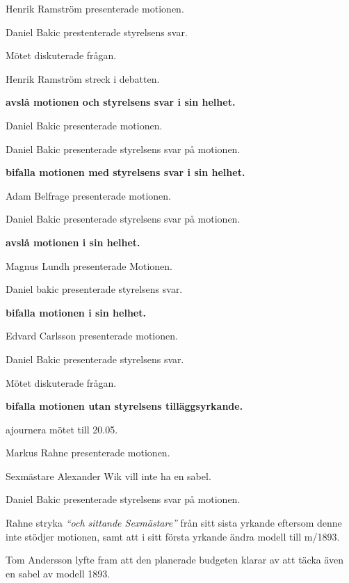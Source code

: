 \documentclass[10pt]{article}
\begin{document}
\begin{paragrafer}
\begin{paragrafer}
		Henrik Ramström presenterade motionen.

		Daniel Bakic prestenterade styrelsens svar.

		Mötet diskuterade frågan.

		Henrik Ramström \ypa streck i debatten.

		\Mbaby

		\textbf{\Mba avslå motionen och styrelsens svar i sin helhet.}

		Daniel Bakic presenterade motionen.

		Daniel Bakic presenterade styrelsens svar på motionen.

		\textbf{\Mba bifalla motionen med styrelsens svar i sin helhet.}

		Adam Belfrage presenterade motionen.

		Daniel Bakic presenterade styrelsens svar på motionen.

		\textbf{\Mba avslå motionen i sin helhet.}

		Magnus Lundh presenterade Motionen.

		Daniel bakic presenterade styrelsens svar.

		\textbf{\Mba bifalla motionen i sin helhet.}


		Edvard Carlsson presenterade motionen.

		Daniel Bakic presenterade styrelsens svar.

		Mötet diskuterade frågan.

		\textbf{\Mba bifalla motionen utan styrelsens tilläggsyrkande.}

		\Mba ajournera mötet till 20.05.


		Markus Rahne presenterade motionen.

		Sexmästare Alexander Wik vill inte ha en sabel.

		Daniel Bakic presenterade styrelsens svar på motionen.

		Rahne \ypa stryka \emph{``och sittande Sexmästare''} från sitt sista yrkande eftersom denne inte stödjer motionen, samt att i sitt första yrkande ändra modell till m/1893.

		Tom Andersson lyfte fram att den planerade budgeten klarar av att täcka även en sabel av modell 1893.


\end{paragrafer}
\end{paragrafer}
\end{document}
